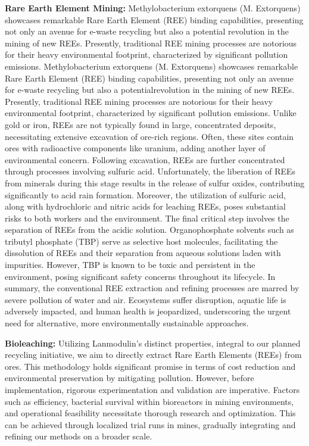 \textbf{Rare Earth Element Mining:}
Methylobacterium extorquens (M. Extorquens) showcases remarkable Rare Earth Element (REE)
binding capabilities, presenting not only an avenue for e-waste recycling but also a potential
revolution in the mining of new REEs. Presently, traditional REE mining processes are notorious for
their heavy environmental footprint, characterized by significant pollution emissions.
Methylobacterium extorquens (M. Extorquens) showcases remarkable Rare Earth Element (REE)
binding capabilities, presenting not only an avenue for e-waste recycling but also a potentialrevolution in the mining of new REEs. Presently, traditional REE mining processes are notorious for
their heavy environmental footprint, characterized by significant pollution emissions.
Unlike gold or iron, REEs are not typically found in large, concentrated deposits, necessitating
extensive excavation of ore-rich regions. Often, these sites contain ores with radioactive components
like uranium, adding another layer of environmental concern.
Following excavation, REEs are further concentrated through processes involving sulfuric acid.
Unfortunately, the liberation of REEs from minerals during this stage results in the release of sulfur
oxides, contributing significantly to acid rain formation. Moreover, the utilization of sulfuric acid,
along with hydrochloric and nitric acids for leaching REEs, poses substantial risks to both workers and
the environment.
The final critical step involves the separation of REEs from the acidic solution. Organophosphate
solvents such as tributyl phosphate (TBP) serve as selective host molecules, facilitating the dissolution
of REEs and their separation from aqueous solutions laden with impurities. However, TBP is known to
be toxic and persistent in the environment, posing significant safety concerns throughout its lifecycle.
In summary, the conventional REE extraction and refining processes are marred by severe pollution of
water and air. Ecosystems suffer disruption, aquatic life is adversely impacted, and human health is
jeopardized, underscoring the urgent need for alternative, more environmentally sustainable
approaches.

\textbf{Bioleaching:}
Utilizing Lanmodulin's distinct properties, integral to our planned recycling initiative, we aim to
directly extract Rare Earth Elements (REEs) from ores. This methodology holds significant promise in
terms of cost reduction and environmental preservation by mitigating pollution. However, before
implementation, rigorous experimentation and validation are imperative. Factors such as efficiency,
bacterial survival within bioreactors in mining environments, and operational feasibility necessitate
thorough research and optimization. This can be achieved through localized trial runs in mines,
gradually integrating and refining our methods on a broader scale.